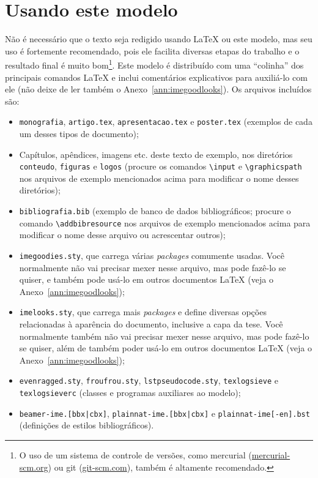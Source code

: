 
\chapter{Usando este modelo}

Não é necessário que o texto seja redigido usando \LaTeX{} ou este modelo,
mas seu uso é fortemente recomendado, pois ele facilita diversas etapas do
trabalho e o resultado final é muito bom\footnote{O uso de um sistema de
controle de versões, como mercurial (\url{mercurial-scm.org}) ou git
(\url{git-scm.com}), também é altamente recomendado.}. Este modelo é
distribuído com uma ``colinha'' dos principais comandos \LaTeX{} e
inclui comentários explicativos para auxiliá-lo com ele (não deixe de
ler também o Anexo~\ref{ann:imegoodlooks}). Os arquivos incluídos são:

\begin{itemize}
  \item \texttt{monografia}, \texttt{artigo.tex}, \texttt{apresentacao.tex}
        e \texttt{poster.tex} (exemplos de cada um desses tipos de documento);
  \item Capítulos, apêndices, imagens etc. deste texto de exemplo, nos
        diretórios \texttt{conteudo}, \texttt{figuras} e \texttt{logos}
        (procure os comandos \texttt{\textbackslash{}input} e
        \texttt{\textbackslash{}graphicspath} nos arquivos de exemplo
        mencionados acima para modificar o nome desses diretórios);
  \item \texttt{bibliografia.bib} (exemplo de banco de dados bibliográficos;
        procure o comando \texttt{\textbackslash{}addbibresource} nos
        arquivos de exemplo mencionados acima para modificar o nome desse
        arquivo ou acrescentar outros);
  \item \texttt{imegoodies.sty}, que carrega várias \emph{packages} comumente
        usadas. Você normalmente não vai precisar mexer nesse arquivo, mas
        pode fazê-lo se quiser, e também pode usá-lo em outros documentos
        \LaTeX{} (veja o Anexo~\ref{ann:imegoodlooks});
  \item \texttt{imelooks.sty}, que carrega mais \emph{packages} e define
        diversas opções relacionadas à aparência do documento, inclusive
        a capa da tese. Você normalmente também não vai precisar mexer
        nesse arquivo, mas pode fazê-lo se quiser, além de também poder
        usá-lo em outros documentos \LaTeX{} (veja o Anexo~\ref{ann:imegoodlooks});
  \item \texttt{evenragged.sty}, \texttt{froufrou.sty}, \texttt{lstpseudocode.sty},
        \texttt{texlogsieve} e \texttt{texlog\-sieverc} (classes e programas
        auxiliares ao modelo);
  \item \texttt{beamer-ime.[bbx|cbx]}, \texttt{plainnat-ime.[bbx|cbx]} e
        \texttt{plainnat-ime[-en].bst} (definições de estilos bibliográficos).
\end{itemize}


